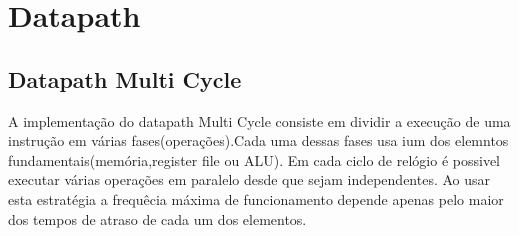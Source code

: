 \documentclass[10pt,a4paper]{book}
\begin{document}
\chapter{Datapath}


		\section{Datapath Multi Cycle}

		    A implementação do datapath Multi Cycle consiste em dividir a execução de uma instrução em várias fases(operações).Cada uma dessas fases usa ium dos elemntos fundamentais(memória,register file ou ALU).
		    Em cada ciclo de relógio é possivel executar várias operações em paralelo desde que sejam independentes. Ao usar esta estratégia a frequêcia máxima de funcionamento depende apenas pelo maior dos tempos de atraso de cada um dos elementos.
\end{document}
